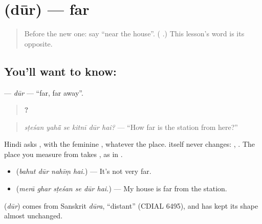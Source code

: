 \section[\texorpdfstring{\hi{दूर} (dūr)}{दूर (dūr)}]{ (dūr) — far}

\label{lesson:HI-C282-dur}



\begin{quote}
Before the new one: say \textquotedblleft{}near the house\textquotedblright{}. (\textbf{  }.) This lesson's word is its opposite.
\end{quote}

\subsection*{You'll want to know: }
\textbf{} — \emph{dūr} — \textquotedblleft{}far, far away\textquotedblright{}.

\begin{quote}
\textbf{     ?}
\end{quote}

\begin{quote}
\emph{sṭeśan yahā̃ se kitnī dūr hai?} — \textquotedblleft{}How far is the station from here?\textquotedblright{}
\end{quote}

Hindi asks \textbf{ }, with the feminine \textbf{}, whatever the place. \textbf{} itself never changes: \textbf{  }, \textbf{  }. The place you measure from takes \textbf{}, as in \textbf{ }.

\begin{itemize}
\raggedright
  \item \textbf{   } (\emph{bahut dūr nahīṃ hai.}) — It's not very far.
  \item \textbf{     } (\emph{merā ghar sṭeśan se dūr hai.}) — My house is far from the station.
\end{itemize}

\begin{cousinweb}
\textbf{} (\emph{dūr}) comes from Sanskrit \emph{dūra}, \textquotedblleft{}distant\textquotedblright{} (CDIAL 6495), and has kept its shape almost unchanged.
\end{cousinweb}

